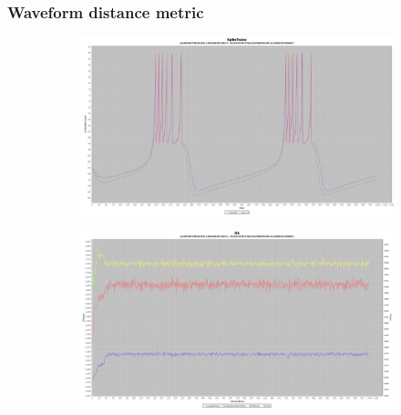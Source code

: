 \documentclass[10pt]{article}
\begin{document}
		\subsubsection{Waveform distance metric}
			\begin{figure}[H]
				\centering
					\begin{subfigure}{.5\textwidth}
						\centering
						\includegraphics[width=\linewidth]{./../images/izzy3/wave/plot.png}

						\label{fig:sub9a}
					\end{subfigure}%
					\begin{subfigure}{.5\textwidth}
						\centering
						\includegraphics[width=\linewidth]{./../images/izzy3/wave/prog.png}
						
						\label{fig:sub9b}
					\end{subfigure}
					
					\label{fig:plot9}
			\end{figure}
\end{document}
